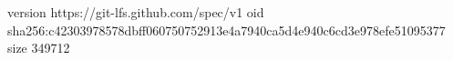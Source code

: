 version https://git-lfs.github.com/spec/v1
oid sha256:c42303978578dbff060750752913e4a7940ca5d4e940c6cd3e978efe51095377
size 349712
